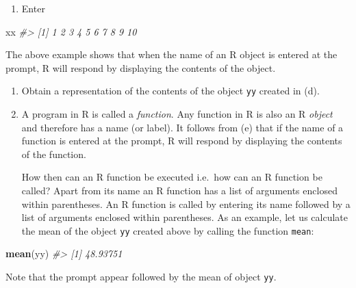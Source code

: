\documentclass[
]{book}
\newenvironment{Shaded}{\begin{snugshade}}{\end{snugshade}}
\newcommand{\CommentTok}[1]{\textcolor[rgb]{0.56,0.35,0.01}{\textit{#1}}}
\newcommand{\FunctionTok}[1]{\textcolor[rgb]{0.13,0.29,0.53}{\textbf{#1}}}
\newcommand{\NormalTok}[1]{#1}
\providecommand{\tightlist}{%
  \setlength{\itemsep}{0pt}\setlength{\parskip}{0pt}}
\begin{document}
\begin{enumerate}
\def\labelenumi{(\alph{enumi})}
\setcounter{enumi}{4}
\tightlist
\item
  Enter
\end{enumerate}

\begin{Shaded}
\begin{Highlighting}[]
\NormalTok{xx}
\CommentTok{\#\textgreater{}  [1]  1  2  3  4  5  6  7  8  9 10}
\end{Highlighting}
\end{Shaded}

The above example shows that {when the name of an R object is entered at the prompt, R will respond by displaying the contents of the object}.

\begin{enumerate}
\def\labelenumi{(\alph{enumi})}
\setcounter{enumi}{5}
\item
  Obtain a representation of the contents of the object \texttt{yy} created in (d).
\item
  A program in R is called a \emph{{function}}. Any function in R is also an R \emph{{object}} and therefore has a name (or label). It follows from (e) that if the name of a function is entered at the prompt, R will respond by displaying the contents of the function.

  How then can an R function be executed i.e.~how can an R function be called? Apart from its name an R function has a list of arguments enclosed within parentheses. An R function is called by entering its name followed by a list of arguments enclosed within parentheses. As an example, let us calculate the mean of the object \texttt{yy} created above by calling the function \texttt{mean}:
\end{enumerate}

\begin{Shaded}
\begin{Highlighting}[]
\FunctionTok{mean}\NormalTok{(yy) }
\CommentTok{\#\textgreater{} [1] 48.93751}
\end{Highlighting}
\end{Shaded}

Note that the prompt appear followed by the mean of object \texttt{yy}.
\end{document}
